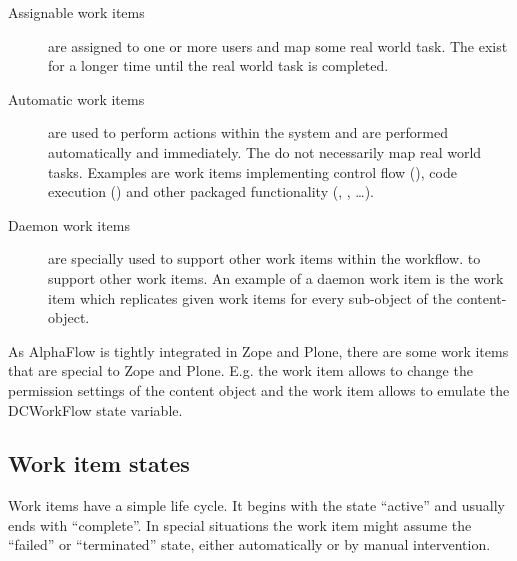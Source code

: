 \begin{description}

    \item[Assignable work items] are assigned to one or more users and map some
        real world task. The exist for a longer time until the real world task
        is completed.

    \item[Automatic work items] are used to perform actions within the system
        and are performed automatically and immediately. The do not necessarily
        map real world tasks. Examples are work items implementing control flow
        (), code execution () and other packaged functionality
        (, ,  \ldots).

    \item[Daemon work items] are specially used to support other work items
        within the workflow.  to support other work items. An example of a
        daemon work item is the  work item which replicates
        given work items for every sub-object of the content-object.
\end{description}

As AlphaFlow is tightly integrated in Zope and Plone, there are some work items
that are special to Zope and Plone. E.g. the  work item allows
to change the permission settings of the content object and the
 work item allows to emulate the DCWorkFlow state variable.

\subsection{Work item states}

Work items have a simple life cycle. It begins with the state ``active'' and
usually ends with ``complete''. In special situations the work item might
assume the ``failed'' or ``terminated'' state, either automatically or by
manual intervention.

